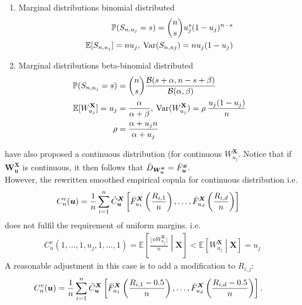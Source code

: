 \documentclass[12pt]{report}
\newcommand{\1}{\mathbf{1}}
\begin{document}
\begin{enumerate}

\item Marginal distributions binomial distributed
\begin{align*}
\mathbb{P} ( S_{n,u_{j}} = s) = \dbinom{n}{s} u_{j}^{s} (1 - u_{j}) ^ {n - s} \\
\mathbb{E}[S_{n,u_{j}}] = n u_{j}, \: \mathrm{Var}(S_{n,u{j}}) = n u_{j} (1 - u_{j})
\end{align*}

\item Marginal distributions beta-binomial distributed
\begin{align*}
\mathbb{P} ( S_{n,u_{j}} = s) &= \dbinom{n}{s} \frac{\mathcal{B}(s + \alpha, n - s + \beta)}{\mathcal{B}(\alpha,\beta)} \\
\mathbb{E}[W^{\textbf{X}}_{u_{j}}] = u_{j} &= \frac{\alpha}{\alpha + \beta}, \: \mathrm{Var}(W^{\textbf{X}}_{u_{j}}) = \rho \: \frac{u_{j} (1 - u_{j})}{n} \\
\rho &= \frac{\alpha + u_{j}n}{\alpha + u_{j}}
\end{align*}
\end{enumerate}
\cite{KojadinovicYi2024Smooth} have also proposed a continuous distribution (for continuous $W^{\boldsymbol{X}}_{u_{j}}$. Notice that if $\boldsymbol{W^{X}_{u}}$ is continuous, it then follows that $\Bar{D}_{\boldsymbol{W^{x}_{u}}} = \Bar{F}^{\boldsymbol{x}}_{\boldsymbol{u}}$. \\
\vspace{0.5cm}
However, the rewritten smoothed empirical copula for continuous distribution i.e.
\begin{align*}
C_{n}^{v}(\boldsymbol{u}) &= \frac{1}{n} \sum\limits_{i = 1}^{n} \Tilde{C}_{\boldsymbol{u}}^{\boldsymbol{X}} \left[\Bar{F}_{u_{1}}^{\boldsymbol{X}}\left(\frac{R_{i,1}}{n}\right), \dots, \Bar{F}_{u_{d}}^{\boldsymbol{X}}\left(\frac{R_{i,d}}{n}\right) \right]
\end{align*}
does not fulfil the requirement of uniform margins. i.e. 
\begin{align*}
C_{n}^{v}(1, \dots, 1, u_{j}, 1, \dots, 1) = \mathbb{E} \left[ \frac{\lfloor nW^{\boldsymbol{X}}_{u_{j}} \rfloor}{n} \middle| \boldsymbol{X} \right] < \mathbb{E} \left[ W^{\boldsymbol{X}}_{u_{j}} \middle| \boldsymbol{X} \right] = u_{j}
\end{align*}
A reasonable adjustment in this case is to add a modification to $R_{i,j}$:
\begin{align*}
C_{n}^{v}(\boldsymbol{u}) &= \frac{1}{n} \sum\limits_{i = 1}^{n} \Tilde{C}_{\boldsymbol{u}}^{\boldsymbol{X}} \left[\Bar{F}_{u_{1}}^{\boldsymbol{X}}\left(\frac{R_{i,1} - 0.5}{n}\right), \dots, \Bar{F}_{u_{d}}^{\boldsymbol{X}}\left(\frac{R_{i,d} - 0.5}{n}\right) \right].
\end{align*}
\end{document}
